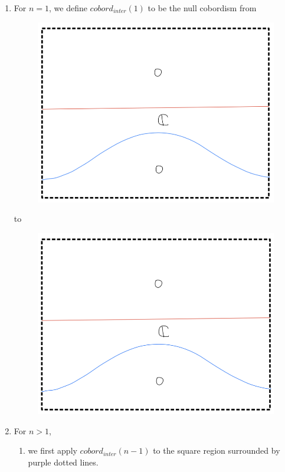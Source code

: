 \begin{enumerate}[label = (\roman*)]
\item For $n=1$, we define $cobord_{inter}(1)$ to be the null cobordism from
\begin{figure}[H]
    \centering
    \includegraphics[scale = 0.75]{diagrams/cobord_inter/2.png}
    \caption{}
    \label{fig:your-label}
\end{figure}
to
\begin{figure}[H]
    \centering
    \includegraphics[scale = 0.75]{diagrams/cobord_inter/3.png}
    \caption{}
    \label{fig:your-label}
\end{figure}
\pagebreak
\item For $n>1$,
\begin{enumerate}[label = (Step \arabic*)]
\item we first apply $cobord_{inter}(n-1)$ to the square region surrounded by purple dotted lines.


\end{enumerate}
\end{enumerate}
